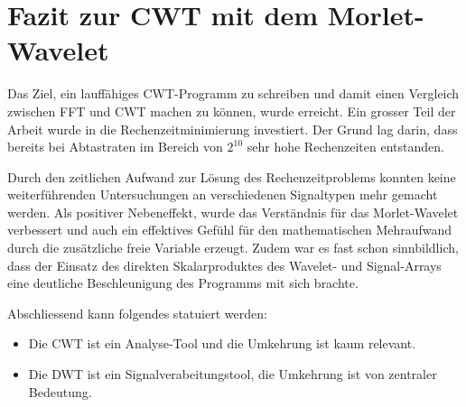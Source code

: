 %
%
%
%
\section{Fazit zur CWT mit dem Morlet-Wavelet
\label{wavelets:section:teil6}}

Das Ziel, ein lauffähiges CWT-Programm zu schreiben und damit einen
Vergleich zwischen FFT und CWT machen zu können, wurde erreicht.
Ein grosser Teil der Arbeit wurde in die Rechenzeitminimierung
investiert.
Der Grund lag darin, dass bereits bei Abtastraten im Bereich von
$2^{10}$ sehr hohe Rechenzeiten entstanden.

Durch den zeitlichen Aufwand zur Lösung des Rechenzeitproblems
konnten keine weiterführenden Untersuchungen an verschiedenen
Signaltypen mehr gemacht werden.
Als positiver Nebeneffekt, wurde das Verständnis für das Morlet-Wavelet
verbessert und auch ein effektives Gefühl für den mathematischen
Mehraufwand durch die zusätzliche freie Variable erzeugt.
Zudem war es fast schon sinnbildlich, dass der Einsatz des direkten
Skalarproduktes des Wavelet- und Signal-Arrays eine deutliche
Beschleunigung des Programms mit sich brachte.

Abschliessend kann folgendes statuiert werden:

\begin{itemize}
	\item Die CWT ist ein Analyse-Tool und die Umkehrung ist kaum relevant.
	\item Die DWT ist ein Signalverabeitungstool, die Umkehrung
	ist von zentraler Bedeutung.
\end{itemize}
